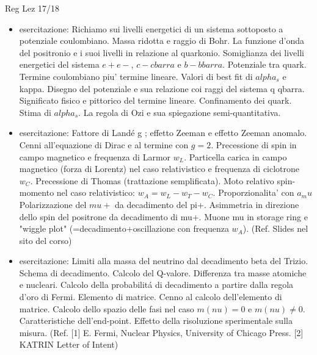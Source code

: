 \begin{frame}[allowframebreaks]{Reg Lez 17/18}
\begin{itemize}
\item esercitazione: Richiamo sui livelli energetici di un sistema sottoposto a potenziale coulombiano. Massa ridotta e raggio di Bohr. La funzione d'onda del positronio e i suoi livelli in relazione al quarkonio. Somiglianza dei livelli energetici del sistema $e+e-$, $c-cbarra$ e $b-bbarra$. Potenziale tra quark. Termine coulombiano piu' termine lineare. Valori di best fit di $alpha_s$ e kappa. Disegno del potenziale e sua relazione coi raggi del sistema q qbarra. Significato fisico e pittorico del termine lineare. Confinamento dei quark. Stima di $alpha_s$. La regola di Ozi e sua spiegazione semi-quantitativa.

\item esercitazione: Fattore di Land\'e g ; effetto Zeeman e effetto Zeeman anomalo. Cenni all'equazione di Dirac e al termine con $g=2$. Precessione di spin in campo magnetico e frequenza di Larmor $w_L$. Particella carica in campo magnetico (forza di Lorentz) nel caso relativistico e frequenza di ciclotrone $w_C$. Precessione di Thomas (trattazione semplificata). Moto relativo spin-momento nel caso relativistico: $w_A = w_L - w_T - w_C$. Proporzionalita' con $a_mu$ Polarizzazione del $mu+$ da decadimento del pi+. Asimmetria in direzione dello spin del positrone da decadimento di mu+. Muone mu in storage ring e "wiggle plot" (=decadimento+oscillazione con frequenza $w_A$). (Ref. Slides nel sito del corso)

\item esercitazione: Limiti alla massa del neutrino dal decadimento beta del Trizio. Schema di decadimento. Calcolo del Q-valore. Differenza tra masse atomiche e nucleari. Calcolo della probabilit\'a di decadimento a partire dalla regola d’oro di Fermi. Elemento di matrice. Cenno al calcolo dell’elemento di matrice. Calcolo dello spazio delle fasi nel caso $m(nu)=0$ e $m(nu)\neq0$. Caratteristiche dell’end-point. Effetto della risoluzione sperimentale sulla misura. (Ref. [1] E. Fermi, Nuclear Physics, University of Chicago Press. [2] KATRIN Letter of Intent) 

\end{itemize}

\end{frame}